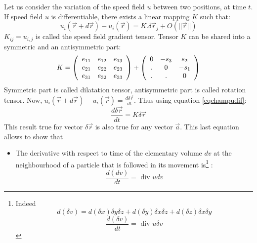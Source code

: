 \documentclass[12pt]{book}
\begin{document}
\begin{exmp}
Let us consider the variation of the speed field $u$ between two positions, at
time 
$t$. If speed field $u$ is differentiable, there
exists a linear mapping $K$ such that:
\begin{equation}\label{eqchampudif}
u_i(\vec r+d\vec r)-u_i(\vec r)=K.\delta\vec r_j + O(||\vec r||)
\end{equation}
$K_{ij}=u_{i,j}$ is called the speed field gradient tensor.
Tensor $K$ can be shared into a symmetric and an antisymmetric part:
\begin{equation}
K=
\left( \begin{array}{ccc}
e_{11}&e_{12}&e_{13}\cr
           e_{21}&e_{22}&e_{23}\cr
           e_{31}&e_{32}&e_{33}\cr
\end{array} \right)
+
\left( \begin{array}{ccc}
0&-s_3&s_2\cr
         .&0&-s_1\cr
         .&.&0\cr
\end{array} \right)
\end{equation}
Symmetric part is called dilatation tensor, antisymmetric part is called
rotation tensor.
Now, $u_i(\vec r+d\vec r)-u_i(\vec r)=\frac{d\delta\vec{r}}{dt}$. Thus using
equation \ref{eqchampudif}:
\begin{equation}
\frac{d\delta\vec r}{dt}=K\delta\vec r
\end{equation}
This result true for vector $\delta\vec r$ is also true for any vector $\vec
a$. This last equation allows to show that
\begin{itemize}
\item The derivative with respect to time of the elementary volume $dv$ at the
neighbourhood of a particle that is followed in its movement 
is\footnote{%
Indeed
\begin{equation}
d(\delta v)=d(\delta x)\delta y\delta z+d(\delta y)\delta x\delta z+d(\delta z)\delta x\delta y
\end{equation}
\begin{equation}\label{eqformvol}
\frac{d(\delta v)}{dt}=\mbox{ div } u \delta v
\end{equation}
}%
:
\begin{equation}
\frac{d(dv)}{dt}=\mbox{ div } u dv
\end{equation}


\end{itemize}
\end{exmp}
\end{document}
